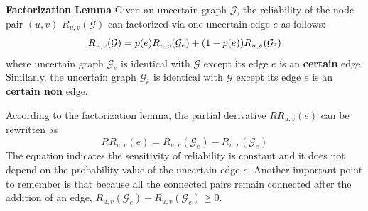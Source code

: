 \begin{lemma}
    \textbf{Factorization Lemma}
       Given an uncertain graph $\mathcal{G}$, the reliability of the node pair $(u,v)$ $R_{u,v}(\mathcal{G})$ can factorized via one uncertain edge $e$ as follows:
    \vj
    \begin{equation*}
        R_{u,v}(\mathcal{G}) = p(e) R_{u,v} (\mathcal{G}_{e}) + (1-p(e)) R_{u,v} (\mathcal{G}_{\bar{e}} )
        \label{eq:fac}
        \svj
    \end{equation*}
    where uncertain graph $\mathcal{G}_{e}$ is identical with $\mathcal{G}$ except its edge $e$ is an \textbf{certain} edge. Similarly, the uncertain graph $\mathcal{G}_{\bar{e}}$ is identical with $\mathcal{G}$ except its edge $e$ is an \textbf{certain non} edge. 
\end{lemma}
According to the factorization lemma, the partial derivative $RR_{u,v}(e)$ can be rewritten as 
\vj
\begin{equation*}
    RR_{u,v}(e)=R_{u,v}(\mathcal{G}_{e})-R_{u,v}(\mathcal{G}_{\bar{e}})
\end{equation*}
\svj
The equation indicates the sensitivity of reliability is constant and it does not depend on the probability value of the uncertain edge $e$. Another important point to remember is that because all the connected pairs remain connected after the addition of an edge, $R_{u,v}(\mathcal{G}_{e}) - R_{u,v} (\mathcal{G}_{\bar{e}}) \ge 0$.


